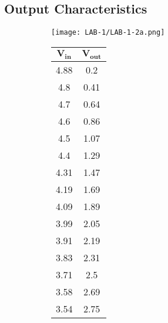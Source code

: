 \documentclass[12pt]{article}
\begin{document}
\subsection{Output Characteristics}
\vspace{4mm}
  \begin{figure}[H]
    \begin{subfigure}{0.7\linewidth}
      \centering
      \texttt{[image: LAB-1/LAB-1-2a.png]}
    \end{subfigure} 
    \begin{subfigure}{0.2\linewidth}
      \centering
      \begin{tabular}{|c|c|}
       \hline
       \bfseries $\mathbf{V_{in}}$	& \bfseries	$\mathbf{V_{out}}$	\\
       \hline
            4.88 &	0.2        \\
            4.8	 &  0.41       \\
            4.7	 &  0.64       \\
            4.6	 &  0.86       \\
            4.5	 &  1.07       \\
            4.4	 &  1.29       \\     
            4.31 &	1.47       \\
            4.19 &	1.69       \\
            4.09 &	1.89        \\
            3.99 &	2.05      \\
            3.91 &	2.19      \\
            3.83 &	2.31          \\
            3.71 &	2.5          \\
            3.58 &	2.69       \\
            3.54 &	2.75          \\

           \hline
      \end{tabular}
    \end{subfigure} 
   \end{figure}
   
   \vspace{9mm}
   
\end{document}
